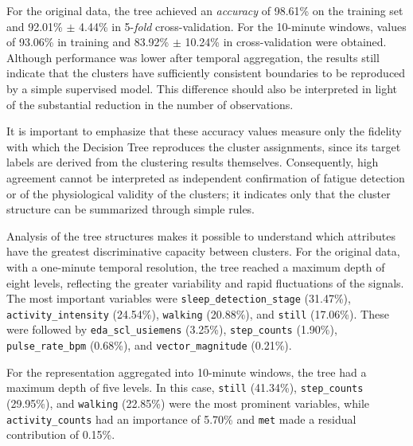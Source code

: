 \documentclass[a4paper,fleqn]{cas-sc}
\newcommand{\newtextteal}[1]{{\color{revteal}#1}}
\begin{document}
\begin{center}
\label{tab:arvore_validacao}
\end{center}

For the original data, the tree achieved an \textit{accuracy} of 98.61\% on the training set and 92.01\% $\pm$ 4.44\% in 5-\textit{fold} cross-validation. For the 10-minute windows, values of 93.06\% in training and 83.92\% $\pm$ 10.24\% in cross-validation were obtained. Although performance was lower after temporal aggregation, the results still indicate that the clusters have sufficiently consistent boundaries to be reproduced by a simple supervised model. This difference should also be interpreted in light of the substantial reduction in the number of observations.

\newtextteal{It is important to emphasize that these accuracy values measure only the fidelity with which the Decision Tree reproduces the cluster assignments, since its target labels are derived from the clustering results themselves. Consequently, high agreement cannot be interpreted as independent confirmation of fatigue detection or of the physiological validity of the clusters; it indicates only that the cluster structure can be summarized through simple rules.}

Analysis of the tree structures makes it possible to understand which attributes have the greatest discriminative capacity between clusters. For the original data, with a one-minute temporal resolution, the tree reached a maximum depth of eight levels, reflecting the greater variability and rapid fluctuations of the signals. The most important variables were \texttt{sleep\_detection\_stage} (31.47\%), \texttt{activity\_intensity} (24.54\%), \texttt{walking} (20.88\%), and \texttt{still} (17.06\%). These were followed by \texttt{eda\_scl\_usiemens} (3.25\%), \texttt{step\_counts} (1.90\%), \texttt{pulse\_rate\_bpm} (0.68\%), and \texttt{vector\_magnitude} (0.21\%).

For the representation aggregated into 10-minute windows, the tree had a maximum depth of five levels. In this case, \texttt{still} (41.34\%), \texttt{step\_counts} (29.95\%), and \texttt{walking} (22.85\%) were the most prominent variables, while \texttt{activity\_counts} had an importance of 5.70\% and \texttt{met} made a residual contribution of 0.15\%.
\end{document}
